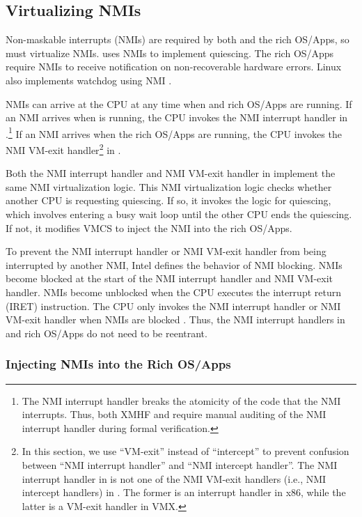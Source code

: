 \subsection{Virtualizing NMIs}
\label{sec:impl_nmi}

Non-maskable interrupts (NMIs) are required by both  and the rich OS/Apps, so  must virtualize NMIs.  uses NMIs to implement quiescing. The rich OS/Apps require NMIs to receive notification on non-recoverable hardware errors. Linux also implements watchdog using NMI \cite{linux_nmi_watchdog}.

NMIs can arrive at the CPU at any time when  and rich OS/Apps are running. If an NMI arrives when  is running, the CPU invokes the NMI interrupt handler in .\footnote{The NMI interrupt handler breaks the atomicity of the  code that the NMI interrupts. Thus, both XMHF and  require manual auditing of the NMI interrupt handler during formal verification.} If an NMI arrives when the rich OS/Apps are running, the CPU invokes the NMI VM-exit handler\footnote{In this section, we use ``VM-exit'' instead of ``intercept'' to prevent confusion between ``NMI interrupt handler'' and ``NMI intercept handler''. The NMI interrupt handler in  is not one of the NMI VM-exit handlers (i.e., NMI intercept handlers) in . The former is an interrupt handler in x86, while the latter is a VM-exit handler in VMX.} in .

Both the NMI interrupt handler and NMI VM-exit handler in  implement the same NMI virtualization logic. This NMI virtualization logic checks whether another CPU is requesting quiescing. If so, it invokes the logic for quiescing, which involves entering a busy wait loop until the other CPU ends the quiescing. If not, it modifies VMCS to inject the NMI into the rich OS/Apps.

To prevent the NMI interrupt handler or NMI VM-exit handler from being interrupted by another NMI, Intel defines the behavior of NMI blocking. NMIs become blocked at the start of the NMI interrupt handler and NMI VM-exit handler. NMIs become unblocked when the CPU executes the interrupt return (IRET) instruction. The CPU only invokes the NMI interrupt handler or NMI VM-exit handler when NMIs are blocked \cite{intel_sdm}. Thus, the NMI interrupt handlers in  and rich OS/Apps do not need to be reentrant.

\subsubsection{Injecting NMIs into the Rich OS/Apps}

